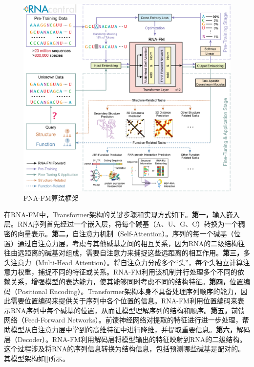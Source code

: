 \documentclass[a4paper,11pt,AutoFakeBold]{ctexart}
\begin{document}
\begin{figure}[h]  
    \centering
    \includegraphics[width=0.8\linewidth]{Figures/RNA-FM.png}
        \caption{FNA-FM算法框架}
        \label{fig:RNA-FM算法框架}
\end{figure}

在RNA-FM中，Transformer架构的关键步骤和实现方式如下。\textbf{第一，}输入嵌入层。RNA序列首先经过一个嵌入层，将每个碱基（A、U、G、C）转换为一个稠密的向量表示。\textbf{第二，}自注意力机制（Self-Attention）。序列的每一个碱基（位置）通过自注意力层，考虑与其他碱基之间的相互关系，因为RNA的二级结构往往由远距离的碱基对组成，需要自注意力来捕捉这些远距离的相互作用。\textbf{第三，}多头注意力（Multi-Head Attention）。将自注意力分成多个“头”，每个头独立计算注意力权重，捕捉不同的特征或关系。RNA-FM利用该机制并行处理多个不同的依赖关系，增强模型的表达能力，使其能够同时考虑不同的结构特征。\textbf{第四，}位置编码（Positional Encoding）。Transformer架构本身不具备处理序列顺序的能力，因此需要位置编码来提供关于序列中各个位置的信息。RNA-FM利用位置编码来表示RNA序列中每个碱基的位置，从而让模型理解序列的结构和顺序。\textbf{第五，}前馈网络（Feed-Forward Networks）。前馈神经网络对提取的特征进行进一步处理，帮助模型从自注意力层中学到的高维特征中进行降维，并提取重要信息。\textbf{第六，}解码层（Decoder）。RNA-FM利用解码层将模型输出的特征映射到RNA的二级结构。这个过程涉及将RNA的序列信息转换为结构信息，包括预测哪些碱基是配对的。其模型架构如\ref{}所示。
\end{document}
